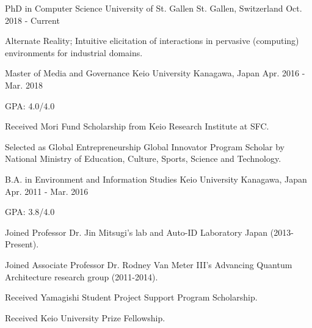 

\begin{cventries}

  \cventry
    {PhD in Computer Science} %
    {University of St. Gallen} %
    {St. Gallen, Switzerland} %
    {Oct. 2018 - Current} %
    {
      \begin{cvitems} %
        \item {Alternate Reality; Intuitive elicitation of interactions in pervasive (computing) environments for industrial domains.}
      \end{cvitems}
    }
    
  \cventry
    {Master of Media and Governance} %
    {Keio University} %
    {Kanagawa, Japan} %
    {Apr. 2016 - Mar. 2018} %
    {
      \begin{cvitems} %
        \item {GPA: 4.0/4.0}
        \item {Received Mori Fund Scholarship from Keio Research Institute at SFC.}
        \item {Selected as Global Entrepreneurship Global Innovator Program Scholar by National Ministry of Education, Culture, Sports, Science and Technology.}
      \end{cvitems}
    }

  \cventry
    {B.A. in Environment and Information Studies} %
    {Keio University} %
    {Kanagawa, Japan} %
    {Apr. 2011 - Mar. 2016} %
    {
      \begin{cvitems} %
        \item {GPA: 3.8/4.0}
        \item {Joined Professor Dr. Jin Mitsugi's lab and Auto-ID Laboratory Japan (2013-Present).}
        \item {Joined Associate Professor Dr. Rodney Van Meter III's Advancing Quantum Architecture research group (2011-2014).}
        \item {Received Yamagishi Student Project Support Program Scholarship.}
        \item {Received Keio University Prize Fellowship.}
      \end{cvitems}
    }


\end{cventries}
